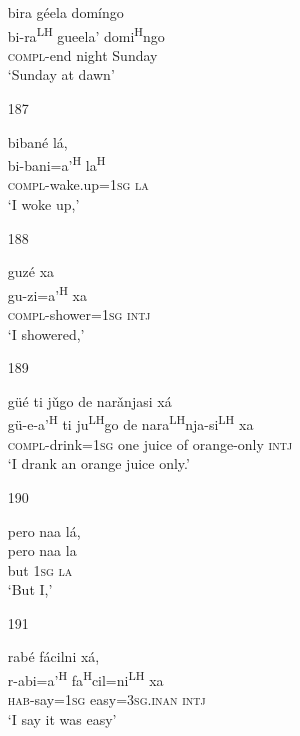 \begin{itemize}
\glll  bira g\'{e}ela dom\'{i}ngo\\
 bi-ra\textsuperscript{LH} gueela' domi\textsuperscript{H}ngo \\
\textsc{compl}-end night Sunday\\
\glt `Sunday at dawn'
 


\item[187]
 
\glll biban\'{e} l\'{a},\\
bi-bani=a'\textsuperscript{H} la\textsuperscript{H}\\
\textsc{compl}-wake.up=\textsc{1sg} \textsc{la}\\
\glt `I woke up,' 



\item [188]

\glll guz\'{e} xa\\
gu-zi=a'\textsuperscript{H} xa\\
\textsc{compl}-shower=\textsc{1sg} \textsc{intj}\\
\glt `I showered,' 


\item [189]

\glll g\"{u}\'{e} ti j\v{u}go de nar\v{a}njasi x\'{a}\\
g\"{u}-e-a'\textsuperscript{H} ti ju\textsuperscript{LH}go de nara\textsuperscript{LH}nja-si\textsuperscript{LH} xa\\
\textsc{compl}-drink=\textsc{1sg} one juice of orange-only \textsc{intj}\\
\glt `I drank an orange juice only.'



\item[190]
 
\glll   pero naa l\'{a}, \\
 pero naa la\\
 but \textsc{1sg} \textsc{la}\\
\glt `But I,'
 


\item[191]
 
\glll   rab\'{e} f\'{a}cilni x\'{a}, \\
 r-abi=a'\textsuperscript{H} fa\textsuperscript{H}cil=ni\textsuperscript{LH} xa\\
\textsc{hab}-say=\textsc{1sg} easy=\textsc{3sg.inan} \textsc{intj}\\
\glt `I say it was easy'
 



\end{itemize}

